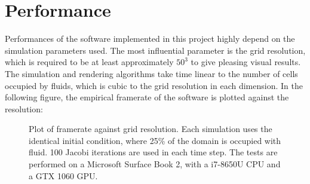 \section{Performance}

Performances of the software implemented in this project highly depend on the simulation parameters used. The most influential parameter is the grid resolution, which is required to be at least approximately $50^3$ to give pleasing visual results. The simulation and rendering algorithms take time linear to the number of cells occupied by fluids, which is cubic to the grid resolution in each dimension. In the following figure, the empirical framerate of the software is plotted against the resolution:

\begin{figure}[H]
    \centering

    
    \caption{Plot of framerate against grid resolution. Each simulation uses the identical initial condition, where 25\% of the domain is occupied with fluid. 100 Jacobi iterations are used in each time step. The tests are performed on a Microsoft Surface Book 2, with a i7-8650U CPU and a GTX 1060 GPU.}
    \label{fig FPS vs grid res}
\end{figure}


